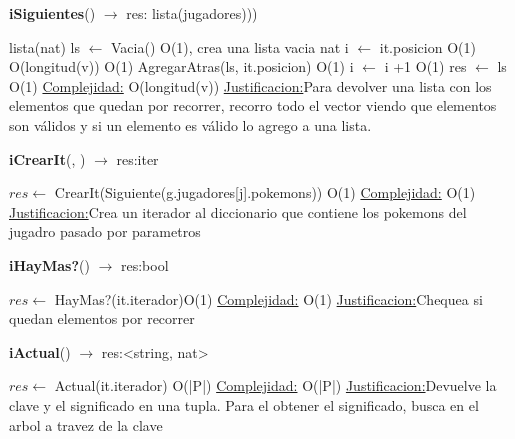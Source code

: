 \begin{Algoritmos}
\begin{algorithm}[H]{\textbf{iSiguientes}() $\to$ res: lista(jugadores)))}
	\begin{algorithmic}[1]
		\State lista(nat) ls $\gets$ Vacia() \Comment O(1), crea una lista vacia
		\State nat i $\gets$ it.posicion \Comment O(1)
		 \Comment O(longitud(v))
			 \Comment O(1)
				\State AgregarAtras(ls, it.posicion) \Comment O(1)
			\EndIf
		\State i $\gets$ i +1 \Comment O(1)		
		\EndWhile
		\State res $\gets$ ls \Comment O(1)
		\medskip
		\Statex \underline{Complejidad:} O(longitud(v))
		\Statex \underline{Justificacion:}Para devolver una lista con los elementos que quedan por recorrer, recorro todo el vector viendo que elementos son válidos y si un elemento es válido lo agrego a una lista.
	\end{algorithmic}
\end{algorithm}


\begin{algorithm}[H]{\textbf{iCrearIt}(, ) $\to$ res:iter}
	\begin{algorithmic}[1]
		\State $res \gets$ CrearIt(Siguiente(g.jugadores[j].pokemons)) \Comment O(1)
		\medskip
		\Statex \underline{Complejidad:} O(1)
			\Statex \underline{Justificacion:}Crea un iterador al diccionario que contiene los pokemons del jugadro pasado por parametros
	\end{algorithmic}
\end{algorithm}


\begin{algorithm}[H]{\textbf{iHayMas?}() $\to$ res:bool}
	\begin{algorithmic}[1]
		\State $res \gets$ HayMas?(it.iterador)\Comment O(1)
		\medskip
		\Statex \underline{Complejidad:} O(1)
			\Statex \underline{Justificacion:}Chequea si quedan elementos por recorrer
	\end{algorithmic}
\end{algorithm}


\begin{algorithm}[H]{\textbf{iActual}() $\to$ res:<string, nat>}
	\begin{algorithmic}[1]
		\State $res \gets$ Actual(it.iterador) \Comment O(|P|)
		\medskip
		\Statex \underline{Complejidad:} O(|P|)
			\Statex \underline{Justificacion:}Devuelve la clave y el significado en una tupla. Para el obtener el significado, busca en el arbol a travez de la clave
	\end{algorithmic}
\end{algorithm}


\end{Algoritmos}
